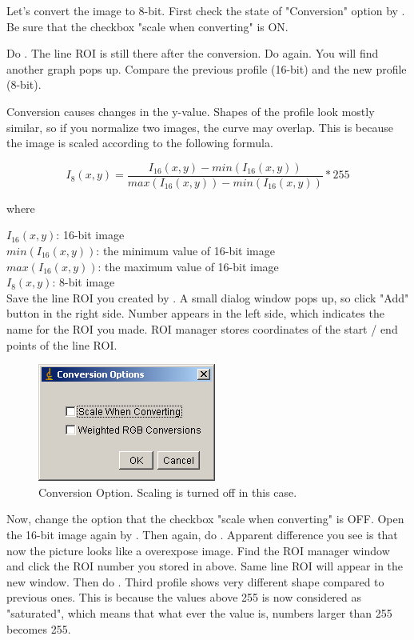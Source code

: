 \begin{indentexercise}{1}
Let's convert the image to 8-bit. First check the state
of "Conversion" option by
. Be
sure that the checkbox "scale when
converting" is ON. 



Do . The line
ROI is still there after the conversion. Do again. 
You will find another graph pops up. Compare the previous profile (16-bit) and the new profile (8-bit).

Conversion causes changes in the y-value. Shapes of the profile look
mostly similar, so if you normalize two images, the curve may overlap.
This is because the image is scaled according to the following
formula.

\[
I_{8}(x,y) = \frac{I_{16}(x, y) - min(I_{16}(x,y))}{ max(I_{16}(x,y)) -  min(I_{16}(x,y))} *255
\]

where

$I_{16}(x, y)$: 16-bit image\\
$min(I_{16}(x,y))$: the minimum value of 16-bit image\\
$max(I_{16}(x,y))$: the maximum value of 16-bit image\\
$I_{8}(x, y)$: 8-bit image\\


Save the line ROI you created by . A small dialog window pops up, so
click "Add" button in the right side.
Number appears in the left side, which indicates the name for the ROI
you made. ROI manager stores coordinates of the start / end points of
the line ROI.

\begin{figure}[htbp]
\begin{center}
\includegraphics[width=5.847cm,height=3.863cm]{img/CMCIBasicCourse201102-img8.png}
\caption{Conversion Option. Scaling is turned off in this case. }
\label{fig:img8}
\end{center}
\end{figure}

Now, change the option  that the checkbox "scale when
converting" is OFF. Open the 16-bit image again by
. Then
again, do .
Apparent difference you see is that now the picture looks like a
overexpose image. Find the ROI manager window and click the ROI number
you stored in above. Same line ROI will appear in the new window. Then
do . Third profile
shows very different shape compared to previous ones. This is because
the values above 255 is now considered as
"saturated", which means that what ever the
value is, numbers larger than 255 becomes 255.


\end{indentexercise}
